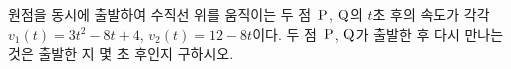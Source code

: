 원점을 동시에 출발하여 수직선 위를 움직이는 두 점~$\mathrm{P}$, $\mathrm{Q}$의 $t$초 후의 속도가 각각 $v_1(t)=3t^2-8t+4$, $v_2(t)=12-8t$이다. 두 점~$\mathrm{P}$, $\mathrm{Q}$가 출발한 후 다시 만나는 것은 출발한 지 몇 초 후인지 구하시오.
